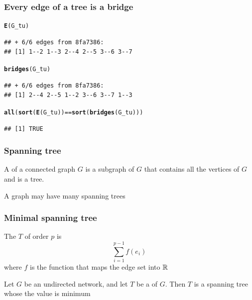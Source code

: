 \documentclass[aspectratio=169]{beamer}\usepackage[]{graphicx}\usepackage[]{xcolor}
\makeatletter
\newcommand{\hlopt}[1]{\textcolor[rgb]{0,0,0}{#1}}%
\newcommand{\hldef}[1]{\textcolor[rgb]{0.345,0.345,0.345}{#1}}%
\newcommand{\hlkwd}[1]{\textcolor[rgb]{0.737,0.353,0.396}{\textbf{#1}}}%
\newenvironment{kframe}{%
 \def\at@end@of@kframe{}%
 \ifinner\ifhmode%
  \def\at@end@of@kframe{\end{minipage}}%
  \begin{minipage}{\columnwidth}%
 \fi\fi%
 \def\FrameCommand##1{\hskip\@totalleftmargin \hskip-\fboxsep
 \colorbox{shadecolor}{##1}\hskip-\fboxsep
     \hskip-\linewidth \hskip-\@totalleftmargin \hskip\columnwidth}%
 \MakeFramed {\advance\hsize-\width
   \@totalleftmargin\z@ \linewidth\hsize
   \@setminipage}}%
 {\par\unskip\endMakeFramed%
 \at@end@of@kframe}
\newenvironment{knitrout}{}{} %
\makeatother
\begin{document}
\begin{frame}[fragile]\frametitle{Every edge of a tree is a bridge}
\begin{knitrout}
\color{fgcolor}\begin{kframe}
\begin{alltt}
\hlkwd{E}\hldef{(G_tu)}
\end{alltt}
\begin{verbatim}
## + 6/6 edges from 8fa7386:
## [1] 1--2 1--3 2--4 2--5 3--6 3--7
\end{verbatim}
\begin{alltt}
\hlkwd{bridges}\hldef{(G_tu)}
\end{alltt}
\begin{verbatim}
## + 6/6 edges from 8fa7386:
## [1] 2--4 2--5 1--2 3--6 3--7 1--3
\end{verbatim}
\begin{alltt}
\hlkwd{all}\hldef{(}\hlkwd{sort}\hldef{(}\hlkwd{E}\hldef{(G_tu))} \hlopt{==} \hlkwd{sort}\hldef{(}\hlkwd{bridges}\hldef{(G_tu)))}
\end{alltt}
\begin{verbatim}
## [1] TRUE
\end{verbatim}
\end{kframe}
\end{knitrout}
\end{frame}


\begin{frame}\frametitle{Spanning tree}
	\begin{definition}
	A  of a connected graph $G$ is a subgraph of $G$ that contains all the vertices of $G$ and is a tree.
	\end{definition}
	\vfill
	A graph may have many spanning trees
\end{frame}


\begin{frame}\frametitle{Minimal spanning tree}
	\begin{definition}
	The  $T$ of order $p$ is
	$$\sum_{i=1}^{p-1}f(e_i)$$
	where $f$ is the function that maps the edge set into $\mathbb{R}$
	\end{definition}
	\vfill
	\begin{definition}
	Let $G$ be an undirected network, and let $T$ be a  of $G$. Then $T$ is a spanning tree whose the value is minimum
	\end{definition}
\end{frame}
\end{document}
